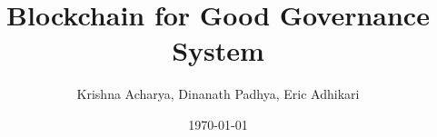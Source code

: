 \usepackage{graphicx}
\usepackage[justification=centering]{caption} %
\usepackage{url} %
\usepackage[nottoc]{tocbibind} %
\usepackage{tocloft} %
\usepackage[a4paper, left=1.5in, right=1in, top=1in, bottom=1in]{geometry}
\usepackage{parskip}
\usepackage{listings}
\usepackage{xcolor} %
\usepackage[]{times}
\usepackage{times} %
\usepackage{caption} %
\usepackage{setspace} %
\usepackage{graphicx} %
\usepackage{datetime2} %
\usepackage{titlesec} %
\usepackage{textcase} %
\usepackage{microtype} %
\usepackage[]{parskip} %
\usepackage{sectsty} %
\usepackage{setspace} %
\usepackage[numbers]{natbib} %


\newcommand\cUniversity{Tribhuvan University}
\newcommand\cDepartment{Institute of Engineering}
\newcommand\cCampus{Thapathali Campus}
\newcommand\cTitle{Blockchain for Good Governance System}
\newcommand\cSubmittedI{Krishna Acharya (THA078BEI020)}
\newcommand\cSubmittedII{Eric Adhikari (THA078BEI020)}
\newcommand\cSubmittedIII{Krishna Acharya (THA078BEI020)}
\newcommand\cSubmittedIV{Eric Adhikari (THA078BEI020)}
\newcommand\cSupervisor{Sup.Dinanath Padhya}
\newcommand\cProjectCoordinator{CoorBibek Poudel}
\newcommand\cHOD{HodBibek Poudel}
\newcommand\cExternalExaminer{extBibek Poudel}


\newcommand\cDate{March 2023}

\onehalfspacing %
\title{\cTitle}
\date{\today}
\author{Krishna Acharya, Dinanath Padhya, Eric Adhikari}

